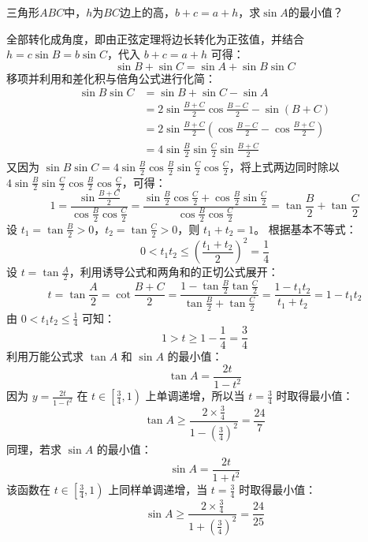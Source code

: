 \documentclass[lang=cn,11pt]{elegantbook}
\begin{document}
\begin{exercise}
三角形$ABC$中，$h$为$BC$边上的高，$b+c=a+h$，求$\sin A$的最小值？
\end{exercise}
\begin{solution}
全部转化成角度，即由正弦定理将边长转化为正弦值，并结合 $h = c\sin B = b\sin C$，代入 $b+c=a+h$ 可得：
\[ \sin B + \sin C = \sin A + \sin B\sin C \]
移项并利用和差化积与倍角公式进行化简：
\begin{align*}
\sin B\sin C &= \sin B + \sin C - \sin A \\
&= 2\sin \frac{B+C}{2}\cos \frac{B-C}{2} - \sin(B+C) \\
&= 2\sin \frac{B+C}{2}\left(\cos \frac{B-C}{2} - \cos \frac{B+C}{2}\right) \\
&= 4\sin \frac{B}{2}\sin \frac{C}{2}\sin \frac{B+C}{2}
\end{align*}
又因为 $\sin B\sin C = 4\sin \frac{B}{2}\cos \frac{B}{2}\sin \frac{C}{2}\cos \frac{C}{2}$，将上式两边同时除以 $4\sin \frac{B}{2}\sin \frac{C}{2}\cos \frac{B}{2}\cos \frac{C}{2}$，可得：
\[ 1 = \frac{\sin \frac{B+C}{2}}{\cos \frac{B}{2}\cos \frac{C}{2}} = \frac{\sin \frac{B}{2}\cos \frac{C}{2} + \cos \frac{B}{2}\sin \frac{C}{2}}{\cos \frac{B}{2}\cos \frac{C}{2}} = \tan \frac{B}{2} + \tan \frac{C}{2} \]
设 $t_1 = \tan \frac{B}{2} > 0$，$t_2 = \tan \frac{C}{2} > 0$，则 $t_1 + t_2 = 1$。
根据基本不等式：
\[ 0 < t_1t_2 \le \left(\frac{t_1+t_2}{2}\right)^2 = \frac{1}{4} \]
设 $t = \tan \frac{A}{2}$，利用诱导公式和两角和的正切公式展开：
\[ t = \tan \frac{A}{2} = \cot \frac{B+C}{2} = \frac{1 - \tan \frac{B}{2}\tan \frac{C}{2}}{\tan \frac{B}{2} + \tan \frac{C}{2}} = \frac{1-t_1t_2}{t_1+t_2} = 1 - t_1t_2 \]
由 $0 < t_1t_2 \le \frac{1}{4}$ 可知：
\[ 1 > t \ge 1 - \frac{1}{4} = \frac{3}{4} \]
利用万能公式求 $\tan A$ 和 $\sin A$ 的最小值：
\[ \tan A = \frac{2t}{1-t^2} \]
因为 $y = \frac{2t}{1-t^2}$ 在 $t \in \left[\frac{3}{4}, 1\right)$ 上单调递增，所以当 $t = \frac{3}{4}$ 时取得最小值：
\[ \tan A \ge \frac{2 \times \frac{3}{4}}{1 - \left(\frac{3}{4}\right)^2} = \frac{24}{7} \]
同理，若求 $\sin A$ 的最小值：
\[ \sin A = \frac{2t}{1+t^2} \]
该函数在 $t \in \left[\frac{3}{4}, 1\right)$ 上同样单调递增，当 $t = \frac{3}{4}$ 时取得最小值：
\[ \sin A \ge \frac{2 \times \frac{3}{4}}{1 + \left(\frac{3}{4}\right)^2} = \frac{24}{25} \]
\end{solution}
\end{document}
